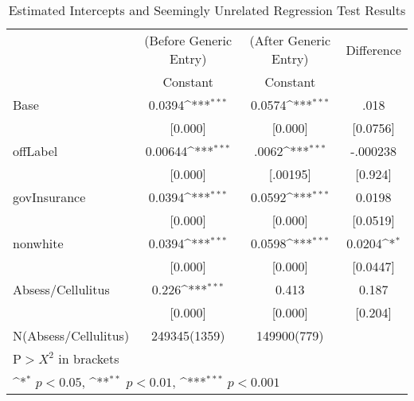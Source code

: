 \begin{table}[htbp]\centering
\def\sym#1{\ifmmode^{#1}\else\(^{#1}\)\fi}
\caption{Estimated Intercepts and Seemingly Unrelated Regression Test Results\label{tab1}}
\begin{tabular}{l*{3}{c}}
\hline\hline
            &\multicolumn{1}{c}{(Before Generic Entry)}&\multicolumn{1}{c}{(After Generic Entry)}&\multicolumn{1}{c}{Difference}\\
            &\multicolumn{1}{c}{Constant}&\multicolumn{1}{c}{Constant}&\multicolumn{1}{c}{}\\
\hline
Base&   0.0394\sym{***}&   0.0574\sym{***}&   .018\\
            &     [0.000]         &     [0.000]         &     [0.0756]       \\
[1em]
offLabel    &     0.00644\sym{***}&     .0062\sym{***}&   -.000238\\
            &    [0.000]         &    [.00195]         &    [0.924]         \\
[1em]
govInsurance&    0.0394\sym{***}         &     0.0592\sym{***} &   0.0198\\
            &      [0.000]         &      [0.000]        &    [0.0519]         \\
[1em]
nonwhite    &  0.0394\sym{***}         &     0.0598\sym{***}&   0.0204\sym{*}\\
            &     [0.000]        &      [0.000]         &    [0.0447]         \\
[1em]
Absess/Cellulitus    &  0.226\sym{***}         &     0.413&   0.187\\
            &     [0.000]        &      [0.000]         &    [0.204]         \\
\hline
N(Absess/Cellulitus)           &      249345(1359)         &      149900(779)\\
\hline\hline
\multicolumn{3}{l}{\footnotesize $\text{P}> X^2$ in brackets}\\
\multicolumn{3}{l}{\footnotesize \sym{*} \(p<0.05\), \sym{**} \(p<0.01\), \sym{***} \(p<0.001\)}\\
\end{tabular}
\end{table}
